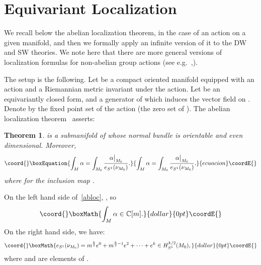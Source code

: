 \documentclass[a4paper,12pt,reqno,sumlimits]{amsart}
\theoremstyle{plain}
\newtheorem{thm}{Theorem}
\theoremstyle{definition}
\providecommand{\C}{{\mathbb C}}
\providecommand{\1}{{\bf 1}}
\providecommand{\uu}{{\mathfrak  u}}
\providecommand{\inc}{\hookrightarrow}
\providecommand{\rk}{{\operatorname{rk}}}
\numberwithin{equation}{section}
\begin{document}

\section{Equivariant Localization} 
\label{equivloc}

We recall below the abelian localization theorem, in the case of an \coordHE{}
action on a given manifold, and then we formally apply an infinite version of
it to the DW and SW theories.  We note here that there are more general
versions of localization formulas for non-abelian group actions (see
e.g.~\cite{bgv},\cite{guillemin}).

The setup is the following.  Let \coordHE{} be a compact oriented manifold equipped
with an \coordHE{} action and a Riemannian metric \coordHE{} invariant under the action.
Let \coordHE{} be an equivariantly closed form, and \coordHE{} a
generator of \myHighlight{$\uu(1)^*$}\coordHE{} which induces the vector field \coordHE{} on \coordHE{}.  Denote by
\coordHE{} the fixed point set of the \coordHE{} action (the zero set of \coordHE{}).  The
abelian localization theorem~\cite[Theorem 7.13]{bgv} asserts:
\begin{thm}
  \coordHE{} is a submanifold of \coordHE{} whose normal bundle \coordHE{} is
  orientable and even dimensional. Moreover,
  \begin{equation}\coord{}\boxEquation{
    \label{abloc}
    \int_M\alpha=\int_{M_0}\frac{\alpha\big|_{M_0}}{e_{S^1}(\nu_{M_0})}.
  }{
    \int_M\alpha=\int_{M_0}\frac{\alpha\big|_{M_0}}{e_{S^1}(\nu_{M_0})}.
  }{ecuacion}\coordE{}\end{equation}
  where \coordHE{} for the inclusion map \myHighlight{$i:M_0\inc M$}\coordHE{}.
\end{thm}
On the left hand side of~\eqref{abloc}, 
\myHighlight{$\alpha\in\C[m]\otimes\Omega(M)^{S^1}$}\coordHE{}, so 
$$\coord{}\boxMath{
\int_M\alpha\in\C[m].
}{dollar}{0pt}\coordE{}$$
On the right hand side, we have:
$$\coord{}\boxMath{
e_{S^1}(\nu_{M_0})=m^{\frac{k}{2}}e^0 + m^{\frac{k}{2}-1}e^2 +\cdots+ e^k
\in H_{S^1}^{k/2}(M_0),
}{dollar}{0pt}\coordE{}$$
where \myHighlight{$k=\rk(\nu_{M_0})$}\coordHE{} and \coordHE{} are elements of \coordHE{}.
\end{document}
